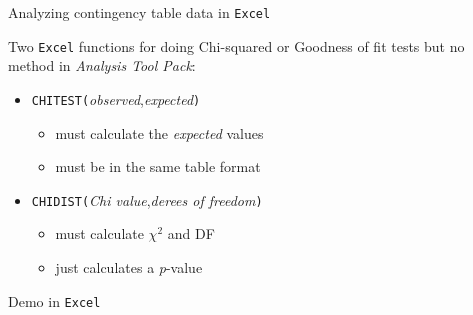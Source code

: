 \documentclass[
  ignorenonframetext,
  t]{beamer}
\providecommand{\tightlist}{%
  \setlength{\itemsep}{0pt}\setlength{\parskip}{0pt}}
\begin{document}
\begin{frame}[fragile]{Analyzing contingency table data in
\texttt{Excel}}
\protect\hypertarget{analyzing-contingency-table-data-in-2}{}

Two \texttt{Excel} functions for doing Chi-squared or Goodness of fit
tests but no method in \emph{Analysis Tool Pack}:

\begin{itemize}
\tightlist
\item
  \texttt{CHITEST(}\emph{observed},\emph{expected}\texttt{)}

  \begin{itemize}
  \tightlist
  \item
    must calculate the \emph{expected} values
  \item
    must be in the same table format
  \end{itemize}
\item
  \texttt{CHIDIST(}\emph{Chi value},\emph{derees of freedom}\texttt{)}

  \begin{itemize}
  \tightlist
  \item
    must calculate \(\chi^2\) and DF
  \item
    just calculates a \emph{p}-value
  \end{itemize}
\end{itemize}

\vfill
\centering

Demo in \texttt{Excel}

\vfill

\end{frame}
\end{document}
